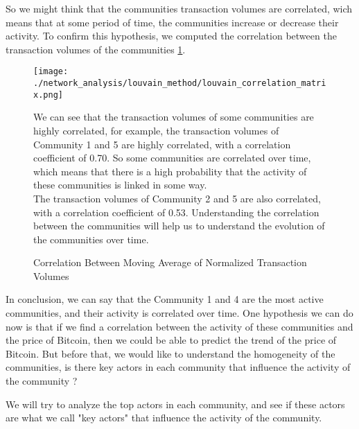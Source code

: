\documentclass[a4paper, 12pt]{article}
\begin{document}
So we might think that the communities transaction volumes are correlated, wich means that at some period of time, 
the communities increase or decrease their activity. 
To confirm this hypothesis, we computed the correlation between the transaction volumes of the communities \ref{fig:louvain_correlation_matrix}.

\begin{figure}[h]
    \begin{minipage}{0.5\linewidth}
        \texttt{[image: ./network\_analysis/louvain\_method/louvain\_correlation\_matrix.png]}
        \caption{Correlation Between Moving Average of Normalized Transaction Volumes}
        \label{fig:louvain_correlation_matrix}
    \end{minipage}%
    \hspace{0.05\linewidth} %
    \begin{minipage}{0.45\linewidth}
        We can see that the transaction volumes of some communities are highly correlated, for example,
        the transaction volumes of Community 1 and 5 are highly correlated, with a correlation coefficient of 0.70.
        So some communities are correlated over time, which means that there is a high probability that the activity of these communities is linked in some way. \\
        
        The transaction volumes of Community 2 and 5 are also correlated, with a correlation coefficient of 0.53.
        Understanding the correlation between the communities will help us to understand the evolution of the communities over time. \\
        \vfill
    \end{minipage}
\end{figure}


In conclusion, we can say that the Community 1 and 4 are the most active communities, and their activity is correlated over time. 
One hypothesis we can do now is that if we find a correlation between the activity of these communities and the price of Bitcoin, 
then we could be able to predict the trend of the price of Bitcoin. But before that, we would like to understand the homogeneity of the communities,
is there key actors in each community that influence the activity of the community ?

We will try to analyze the top actors in each community, and see if these actors are what we call "key actors" that influence the activity of the community.
\end{document}
